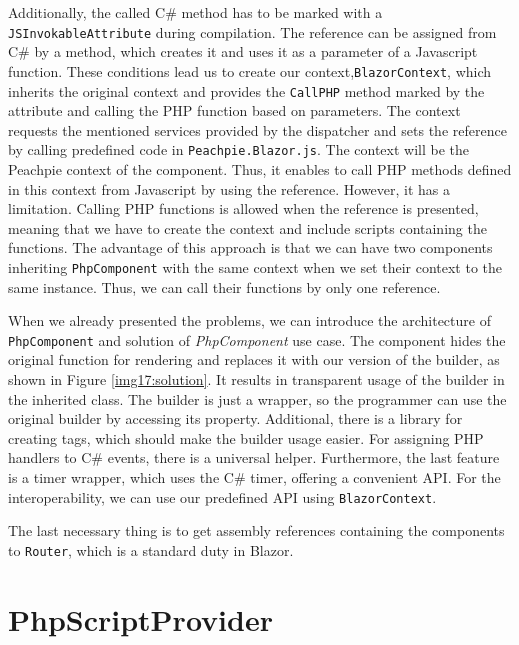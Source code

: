 Additionally, the called C\# method has to be marked with a \texttt{JSInvokableAttribute} during compilation.
The reference can be assigned from C\# by a method, which creates it and uses it as a parameter of a Javascript function.
These conditions lead us to create our context,\texttt{BlazorContext}, which inherits the original context and provides the \texttt{CallPHP} method marked by the attribute and calling the PHP function based on parameters.
The context requests the mentioned services provided by the dispatcher and sets the reference by calling predefined code in \texttt{Peachpie.Blazor.js}.
The context will be the Peachpie context of the component.
Thus, it enables to call PHP methods defined in this context from Javascript by using the reference.
However, it has a limitation.
Calling PHP functions is allowed when the reference is presented, meaning that we have to create the context and include scripts containing the functions.
The advantage of this approach is that we can have two components inheriting \texttt{PhpComponent} with the same context when we set their context to the same instance.
Thus, we can call their functions by only one reference.
\par
When we already presented the problems, we can introduce the architecture of \texttt{PhpComponent} and solution of \textit{PhpComponent} use case.
The component hides the original function for rendering and replaces it with our version of the builder, as shown in Figure \ref{img17:solution}.
It results in transparent usage of the builder in the inherited class.
The builder is just a wrapper, so the programmer can use the original builder by accessing its property.
Additional, there is a library for creating tags, which should make the builder usage easier.
For assigning PHP handlers to C\# events, there is a universal helper.
Furthermore, the last feature is a timer wrapper, which uses the C\# timer, offering a convenient API.
For the interoperability, we can use our predefined API using \texttt{BlazorContext}.
\par
The last necessary thing is to get assembly references containing the components to \texttt{Router}, which is a standard duty in Blazor.
\section{PhpScriptProvider}

